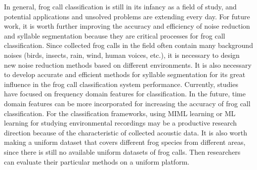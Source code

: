 In general, frog call classification is still in its infancy as a field of study, and potential applications and unsolved problems are extending every day. For future work, it is worth further improving the accuracy and efficiency of noise reduction and syllable segmentation because they are critical processes for frog call classification. Since collected frog calls in the field often contain many background noises (birds, insects, rain, wind, human voices, etc.), it is necessary to design new noise reduction methods based on different environments. It is also necessary to develop accurate and efficient methods for syllable segmentation for its great influence in the frog call classification system performance. Currently, studies have focused on frequency domain features for classification. In the future, time domain features can be more incorporated for increasing the accuracy of frog call classification. For the classification frameworks, using MIML learning or ML learning for studying environmental recordings may be a productive research direction because of the characteristic of collected acoustic data. It is also worth making a uniform dataset that covers different frog species from different areas, since there is still no available uniform datasets of frog calls. Then researchers can evaluate their particular methods on a uniform platform.




